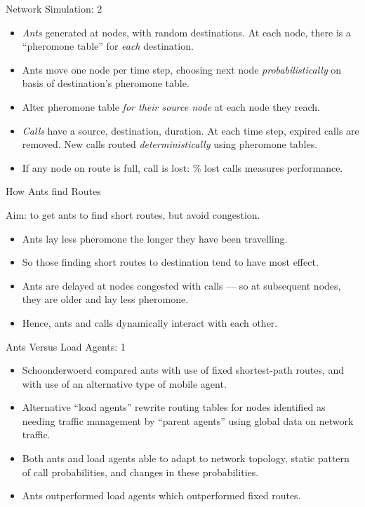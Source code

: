 \documentclass{article}
\begin{document}
\begin{slide}{}
{\Large Network Simulation: 2}
\begin{itemize}
\item {\em Ants} generated at nodes, with random destinations.
At each node, there is a ``pheromone table'' for {\em each} destination.
\item Ants move one node per time step, choosing next node {\em
probabilistically} on basis of destination's pheromone table.
\item Alter pheromone table {\em for their source node} at each node
they reach.
\item {\em Calls} have a source, destination, duration.
At each time step, expired calls are removed. New calls routed
{\em deterministically} using pheromone tables.
\item If any node on route is full, call is lost: \% lost calls
measures performance.
\end{itemize}
\end{slide}

\begin{slide}{}
{\Large How Ants find Routes}

Aim: to get ants to find short routes, but avoid congestion.
\begin{itemize}
\item Ants lay less pheromone the longer they have been travelling.
\item So those finding short routes to destination tend to have most effect.
\item Ants are delayed at nodes congested with calls --- so at
subsequent nodes, they are older and lay less pheromone.
\item Hence, ants and calls dynamically interact with each other.
\end{itemize}
\end{slide}

\begin{slide}{}
{\Large Ants Versus Load Agents: 1}
\begin{itemize}
\item Schoonderwoerd compared ants with use of fixed shortest-path
routes, and with use of an alternative type of mobile agent.
\item Alternative ``load agents'' rewrite routing tables for nodes identified
as needing traffic management by ``parent agents'' using global data
on network traffic.
\item Both ants and load agents able to adapt to network topology,
static pattern of call probabilities, and changes in these probabilities.
\item Ants outperformed load agents which outperformed fixed routes.
\end{itemize}
\end{slide}
\end{document}
